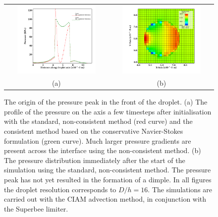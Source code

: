 \begin{figure}
\begin{center}
\begin{tabular}{cc}
\hspace*{-1.0cm}
\includegraphics[width=0.8\textwidth]{plots/raindrop/pressure_compare.png} &
\hspace{-0.4cm}%
\includegraphics[width=0.8\textwidth]{plots/raindrop/nonmc_16ppd_pressure.png}\\
\hspace{-0.8cm}%
(a) & (b)
\end{tabular}
\end{center}
\caption{The origin of the pressure peak in the front of the droplet. 
(a) The profile of the pressure on the axis a few timesteps after initialisation 
with the standard, non-consistent method (red curve) and the consistent method based
on the conservative Navier-Stokes formulation (green curve). 
Much larger pressure gradients are present across the interface using the non-consistent method. 
(b) The pressure distribution immediately after the start of the simulation 
using the standard, non-consistent method. The pressure peak has not yet resulted
in the formation of a dimple. In all figures the droplet resolution corresponds to $D/h = 16$.
The simulations are carried out with the CIAM advection method, in conjunction with the Superbee limiter.}
\label{pressure_1}
\end{figure}

